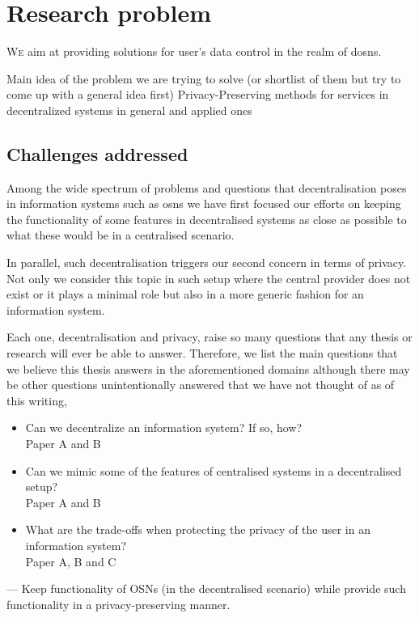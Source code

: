 \documentclass[showtrims,oldfontcommands]{kthesis}
\begin{document}
\chapter{Research problem}
\lettrine{\textcolor[gray]{.25}{W}}{e} aim at providing solutions for user's data 
control in the realm of \acp{dosn}.

Main idea of the problem we are trying to solve (or shortlist of them but try to come up with a general idea first)
Privacy-Preserving methods for services in decentralized systems in general and applied ones


\section{Challenges addressed}
Among the wide spectrum of problems and questions that decentralisation poses in 
information systems such as \acp{osn} we have first focused our efforts on keeping 
the functionality of some features in decentralised systems as close as possible to 
what these would be in a centralised scenario.

In parallel, such decentralisation triggers our second concern in terms of privacy.
Not only we consider this topic in such setup where the central provider does not 
exist or it plays a minimal role but also in a more generic fashion for an information 
system.

Each one, decentralisation and privacy, raise so many questions that any thesis 
or research will ever be able to answer. Therefore, we list the main questions that 
we believe this thesis answers in the aforementioned domains although there may 
be other questions unintentionally answered that we have not thought of as of this 
writing,
\begin{itemize}
	\item Can we decentralize an information system? If so, how?\\
	Paper A and B
	\item Can we mimic some of the features of centralised systems in a decentralised setup?\\
	Paper A and B
	\item What are the trade-offs when protecting the privacy of the user in an information system?\\
	Paper A, B and C
\end{itemize}

---
Keep functionality of OSNs (in the decentralised scenario) while provide such functionality 
in a privacy-preserving manner.
\end{document}
